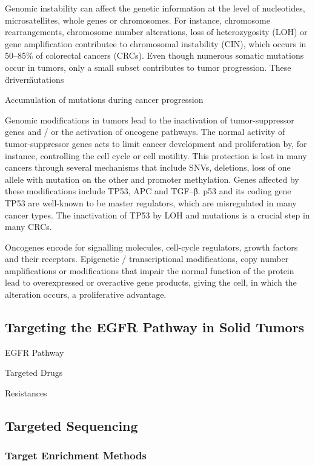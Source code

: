     Genomic instability can affect the genetic information at the level of
    nucleotides, microsatellites, whole genes or chromosomes. For instance,
    chromosome rearrangements, chromosome number alterations, loss of
    heterozygosity (LOH) or gene amplification contributee to chromosomal
    instability (CIN), which occurs in 50--85\% of colorectal cancers (CRCs).
    Even though numerous somatic mutations occur in tumors, only a small subset
    contributes to tumor progression. These \"driver\" mutations

    Accumulation of mutations during cancer progression

    Genomic modifications in tumors lead to the inactivation of tumor-suppressor
    genes and / or the activation of oncogene pathways. The normal activity of
    tumor-suppressor genes acts to limit cancer development and proliferation
    by, for instance, controlling the cell cycle or cell motility. This
    protection is lost in many cancers through several mechanisms that include
    SNVs, deletions, loss of one allele with mutation on the other and promoter
    methylation. Genes affected by these modifications include TP53, APC and
    TGF--β. p53 and its coding gene TP53 are well-known to be master regulators,
    which are misregulated in many cancer types. The inactivation of TP53 by LOH
    and mutations is a crucial step in many CRCs.

    Oncogenes encode for signalling molecules, cell-cycle regulators, growth
    factors and their receptors. Epigenetic / transcriptional modifications,
    copy number amplifications or modifications that impair the normal function
    of the protein lead to overexpressed or overactive gene products, giving the
    cell, in which the alteration occurs, a proliferative advantage.

  \subsection{Targeting the EGFR Pathway in Solid Tumors}

    EGFR Pathway

    Targeted Drugs

    Resistances

  \subsection{Targeted Sequencing}

    \subsubsection{Target Enrichment Methods}

